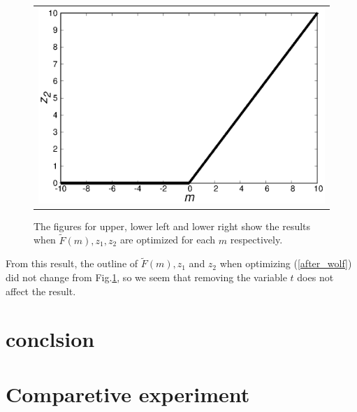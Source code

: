 \documentclass[fp,twocolumn]{jpsj3}
\begin{document}
\begin{figure}[htbp]
\begin{center}
\begin{tabular}{c}
\begin{minipage}{0.50\hsize}
      \end{minipage}
      \begin{minipage}{0.50\hsize}
        \centering
        \includegraphics[keepaspectratio,scale=0.33]{minimum_z2_non_t.eps}
      \end{minipage}
    \end{tabular}
    \caption{The figures for upper, lower left and lower right show the results when $\widetilde{F}(m), z_{1}, z_{2}$ are optimized for each $m$ respectively.}
    \label{fig:minimum2}
  \end{center}
\end{figure}
From this result, the outline of $\widetilde{F}(m), z_{1}$ and $z_{2}$ when optimizing (\ref{after_wolf}) did not change from Fig.\ref{fig:minimum2}, so we seem that removing the variable $t$ does not affect the result.

\section{conclsion}


\section{Comparetive experiment} %
\end{document}
